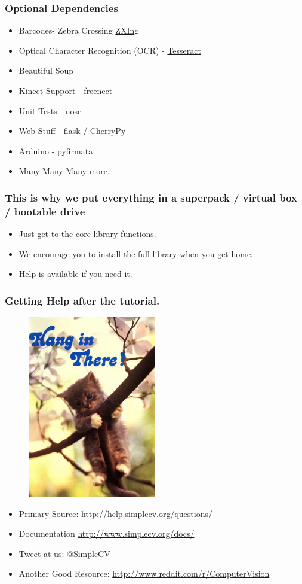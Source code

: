 \documentclass{beamer}
\begin{document}
\begin{frame}
  \frametitle{Optional Dependencies}
  \begin{itemize}
  \item Barcodes- Zebra Crossing \href{https://code.google.com/p/zxing/}{ZXIng}
  \item Optical Character Recognition (OCR) - \href{https://code.google.com/p/tesseract-ocr/}{Tesseract}
  \item Beautiful Soup 
  \item Kinect Support - freenect 
  \item Unit Tests - nose
  \item Web Stuff - flask / CherryPy
  \item Arduino - pyfirmata
  \item Many Many Many more. 
  \end{itemize}
\end{frame}


\begin{frame}
  \frametitle{This is why we put everything in a superpack / virtual
    box / bootable drive}
  \begin{itemize}
  \item Just get to the core library functions.
  \item We encourage you to install the full library when you get
    home.
  \item Help is available if you need it. 
  \end{itemize}
\end{frame}

\begin{frame}
\frametitle{Getting Help after the tutorial.}
\begin{figure}
  \includegraphics[width=0.2\linewidth]{hang-in-there-cat.jpg}
\end{figure}
\begin{itemize}
  \item Primary Source: \url{http://help.simplecv.org/questions/}
  \item Documentation \url{http://www.simplecv.org/docs/}
  \item Tweet at us: $@$Simple\textunderscore CV
  \item Another Good Resource: \url{http://www.reddit.com/r/ComputerVision}
\end{itemize}
\end{frame}
\end{document}
